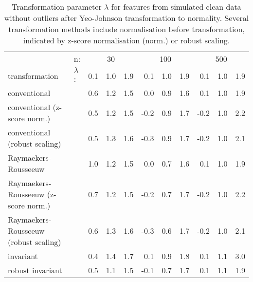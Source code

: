 \documentclass[
  a4paper,
]{article}
\begin{document}
\begin{table}
\begin{center}
\caption{Transformation parameter $\lambda$ for features from simulated clean data without outliers after Yeo-Johnson transformation to normality.
Several transformation methods include normalisation before transformation, indicated by z-score normalisation (norm.) or robust scaling.}
\label{tab:clean-transformation-appendix-lambda-yj}
\small{
\begin{tabular}{l | l r r r r r r r r r}

\toprule
& n: & \multicolumn{3}{c}{30} & \multicolumn{3}{c}{100} & \multicolumn{3}{c}{500} \\
transformation & $\lambda$: & 0.1 & 1.0 & 1.9 & 0.1 & 1.0 & 1.9 & 0.1 & 1.0 & 1.9 \\

\midrule

conventional                          & & 0.6 & 1.2 & 1.5 &  0.0 & 0.9 & 1.6 &  0.1 & 1.0 & 1.9 \\
conventional (z-score norm.)          & & 0.5 & 1.2 & 1.5 & -0.2 & 0.9 & 1.7 & -0.2 & 1.0 & 2.2 \\
conventional (robust scaling)         & & 0.5 & 1.3 & 1.6 & -0.3 & 0.9 & 1.7 & -0.2 & 1.0 & 2.1 \\
Raymaekers-Rousseeuw                  & & 1.0 & 1.2 & 1.5 &  0.0 & 0.7 & 1.6 &  0.1 & 1.0 & 1.9 \\
Raymaekers-Rousseeuw (z-score norm.)  & & 0.7 & 1.2 & 1.5 & -0.2 & 0.7 & 1.7 & -0.2 & 1.0 & 2.2 \\
Raymaekers-Rousseeuw (robust scaling) & & 0.6 & 1.3 & 1.6 & -0.3 & 0.6 & 1.7 & -0.2 & 1.0 & 2.1 \\
invariant                             & & 0.4 & 1.4 & 1.7 &  0.1 & 0.9 & 1.8 &  0.1 & 1.1 & 3.0 \\
robust invariant                      & & 0.5 & 1.1 & 1.5 & -0.1 & 0.7 & 1.7 &  0.1 & 1.1 & 1.9 \\
\bottomrule
\end{tabular}
}
\end{center}
\end{table}
\end{document}
